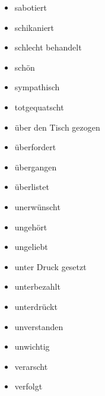 \begin{multicols}{2}
\begin{itemize}
    \item sabotiert
    \item schikaniert
    \item schlecht behandelt
    \item schön
    \item sympathisch
    \item totgequatscht
    \item über den Tisch gezogen
    \item überfordert
    \item übergangen
    \item überlistet
    \item unerwünscht
    \item ungehört
    \item ungeliebt
    \item unter Druck gesetzt
    \item unterbezahlt
    \item unterdrückt
    \item unverstanden
    \item unwichtig
    \item verarscht
    \item verfolgt
  \end{itemize}
\end{multicols}
